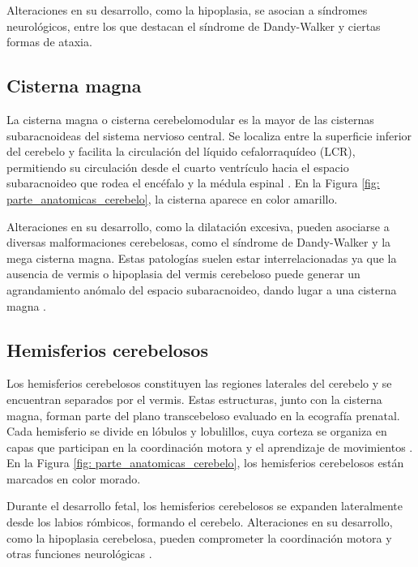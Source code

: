 Alteraciones en su desarrollo, como la hipoplasia, se asocian a síndromes neurológicos, entre los que destacan el síndrome de Dandy-Walker \cite{dandy2023} y ciertas formas de ataxia.

\subsection{Cisterna magna}
La cisterna magna o cisterna cerebelomodular es la mayor de las cisternas subaracnoideas del sistema nervioso central. Se localiza entre la superficie inferior del cerebelo y facilita la circulación del líquido cefalorraquídeo (LCR), permitiendo su circulación desde el cuarto ventrículo hacia el espacio subaracnoideo que rodea el encéfalo y la médula espinal \cite{patel2023cisternamagna}. En la Figura \ref{fig: parte_anatomicas_cerebelo}, la cisterna aparece en color amarillo.

Alteraciones en su desarrollo, como la dilatación excesiva, pueden asociarse a diversas malformaciones cerebelosas, como el síndrome de Dandy-Walker y la mega cisterna magna. Estas patologías suelen estar interrelacionadas ya que la ausencia de vermis o hipoplasia del vermis cerebeloso puede generar un agrandamiento anómalo del espacio subaracnoideo, dando lugar a una cisterna magna \cite{patel2023cisternamagna}.

\subsection{Hemisferios cerebelosos}
Los hemisferios cerebelosos constituyen las regiones laterales del cerebelo y se encuentran separados por el vermis. Estas estructuras, junto con la cisterna magna, forman parte del plano transcebeloso evaluado en la ecografía prenatal. Cada hemisferio se divide en lóbulos y lobulillos, cuya corteza se organiza en capas que participan en la coordinación motora y el aprendizaje de movimientos \cite{kenhub}. En la Figura \ref{fig: parte_anatomicas_cerebelo}, los hemisferios cerebelosos están marcados en color morado.


Durante el desarrollo fetal, los hemisferios cerebelosos se expanden lateralmente desde los labios rómbicos, formando el cerebelo. Alteraciones en su desarrollo, como la hipoplasia cerebelosa, pueden comprometer la coordinación motora y otras funciones neurológicas \cite{volpecerebelo}.

